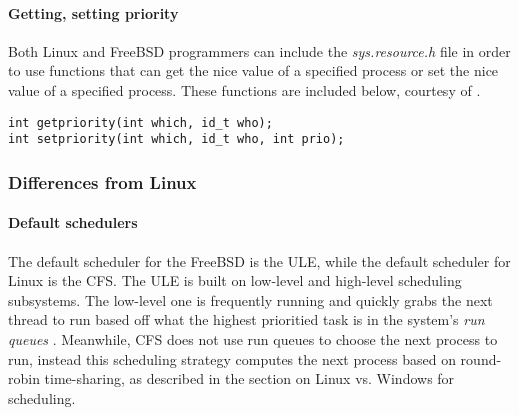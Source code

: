 \documentclass[letterpaper,10pt,titlepage]{article}
\begin{document}
\paragraph{Getting, setting priority} Both Linux and FreeBSD programmers can include the \emph{sys.resource.h} file in order to use functions that can get the nice value of a specified process or set the nice value of a specified process. These functions are included below, courtesy of \cite{ker10}. 
\begin{lstlisting}
int getpriority(int which, id_t who);
int setpriority(int which, id_t who, int prio);
\end{lstlisting}
\subsubsection{Differences from Linux}
\paragraph{Default schedulers}The default scheduler for the FreeBSD is the ULE, while the default scheduler for Linux is the CFS. The ULE is built on low-level and high-level scheduling subsystems. The low-level one is frequently running and quickly grabs the next thread to run based off what the highest prioritied task is in the system's \emph{run queues} \cite{mck15}. Meanwhile, CFS does not use run queues to choose the next process to run, instead this scheduling strategy computes the next process based on round-robin time-sharing, as described in the section on Linux vs. Windows for scheduling.


\newpage
{}

\end{document}

